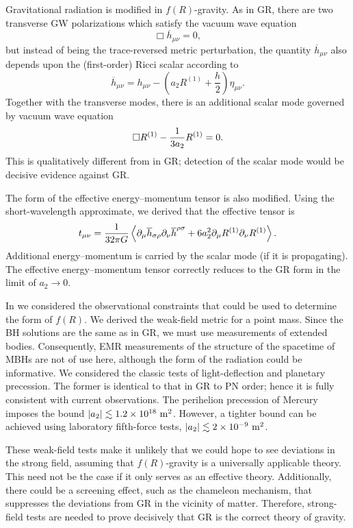 Gravitational radiation is modified in $f(R)$-gravity. As in GR, there are two transverse GW polarizations which satisfy the vacuum wave equation
\begin{equation}
\Box \overline{h}_{\mu\nu} = 0,
\end{equation}
but instead of being the trace-reversed metric perturbation, the quantity $\overline{h}_{\mu\nu}$ also depends upon the (first-order) Ricci scalar according to
\begin{equation}
\overline{h}_{\mu\nu} = h_{\mu\nu} - \left(a_2 R^{(1)} + \dfrac{h}{2}\right)\eta_{\mu\nu}.
\end{equation}
Together with the transverse modes, there is an additional scalar mode governed by vacuum wave equation
\begin{equation}
\Box R^{(1)} - \dfrac{1}{3 a_2} R^{(1)} = 0.
\end{equation}
This is qualitatively different from in GR; detection of the scalar mode would be decisive evidence against GR.

The form of the effective energy--momentum tensor is also modified. Using the short-wavelength approximate, we derived that the effective tensor is
\begin{equation}
t_{\mu\nu} = \dfrac{1}{32\pi G}\left\langle \partial_\mu\overline{h}_{\sigma\rho}\partial_\nu\overline{h}^{\rho\sigma} + 6a_2^2\partial_\mu R^{(1)}\partial_\nu R^{(1)} \right\rangle.
\end{equation}
Additional energy--momentum is carried by the scalar mode (if it is propagating). The effective energy--momentum tensor correctly reduces to the GR form in the limit of $a_2 \rightarrow 0$.

In  we considered the observational constraints that could be used to determine the form of $f(R)$. We derived the weak-field metric for a point mass. Since the BH solutions are the same as in GR, we must use measurements of extended bodies. Consequently, EMR measurements of the structure of the spacetime of MBHs are not of use here, although the form of the radiation could be informative. We considered the classic tests of light-deflection and planetary precession. The former is identical to that in GR to PN order; hence it is fully consistent with current observations. The perihelion precession of Mercury imposes the bound $|a_2| \lesssim 1.2 \times 10^{18}~\mathrm{m^2}$. However, a tighter bound can be achieved using laboratory fifth-force tests, $|a_2| \lesssim 2 \times 10^{-9}~\mathrm{m^2}$.

These weak-field tests make it unlikely that we could hope to see deviations in the strong field, assuming that $f(R)$-gravity is a universally applicable theory. This need not be the case if it only serves as an effective theory. Additionally, there could be a screening effect, such as the chameleon mechanism, that suppresses the deviations from GR in the vicinity of matter. Therefore, strong-field tests are needed to prove decisively that GR is the correct theory of gravity.

